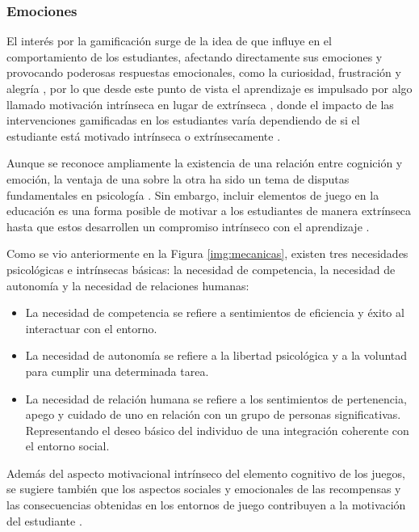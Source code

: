 \subsubsection{Emociones}

El interés por la gamificación surge de la idea de que influye en el comportamiento de los estudiantes, 
afectando directamente sus emociones y provocando poderosas respuestas emocionales, como la curiosidad,
frustración y alegría \cite{Buckley20161162}, por lo que desde este punto de vista el aprendizaje es impulsado
por algo llamado motivación intrínseca en lugar de extrínseca \cite{Danka2020}, donde el impacto de las
intervenciones gamificadas en los estudiantes varía dependiendo de si el estudiante está motivado intrínseca o
extrínsecamente \cite{Buckley20161162}.

Aunque se reconoce ampliamente la existencia de una relación entre cognición y emoción, la ventaja de una 
sobre la otra ha sido un tema de disputas fundamentales en psicología \cite{MULLINS2020304}. Sin embargo, 
incluir elementos de juego en la educación es una forma posible de motivar a los estudiantes de manera
extrínseca hasta que estos desarrollen un compromiso intrínseco con el aprendizaje \cite{Danka2020}.

Como se vio anteriormente en la Figura \ref{img:mecanicas}, existen tres necesidades psicológicas e 
intrínsecas básicas: la necesidad de competencia, la necesidad de autonomía y la necesidad de relaciones
humanas:

\begin{itemize}
\item La necesidad de competencia se refiere a sentimientos de eficiencia y éxito al interactuar con el
entorno.
\item La necesidad de autonomía se refiere a la libertad psicológica y a la voluntad para cumplir una
determinada tarea.
\item La necesidad de relación humana se refiere a los sentimientos de pertenencia, apego y cuidado de uno
en relación con un grupo de personas significativas. Representando el deseo básico del individuo de una
integración coherente con el entorno social.
\end{itemize}

Además del aspecto motivacional intrínseco del elemento cognitivo de los juegos, se sugiere también que los
aspectos sociales y emocionales de las recompensas y las consecuencias obtenidas en los entornos de juego 
contribuyen a la motivación del estudiante \cite{8190501}.

